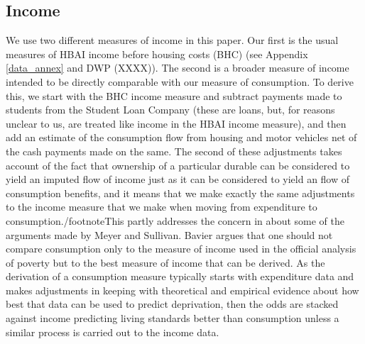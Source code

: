 \subsection{Income}
We use two different measures of income in this paper.  Our first is the usual measures of HBAI income before housing costs (BHC) (see Appendix \ref{data_annex} and DWP (XXXX)). The second is a broader measure of income intended to be directly comparable with our measure of consumption. To derive this, we start with the BHC income measure and subtract payments made to students from the Student Loan Company (these are loans, but, for reasons unclear to us, are treated like income in the HBAI income measure), and then add an estimate of the consumption flow from housing and motor vehicles net of the cash payments made on the same. The second of these adjustments takes account of the fact that ownership of a particular durable can be considered to yield an imputed flow of income just as it can be considered to yield an flow of consumption benefits, and it means that we make exactly the same adjustments to the income measure that we make when moving from expenditure to consumption./footnote{This partly addresses the concern in \cite{Bavier2008} about some of the arguments made by Meyer and Sullivan. Bavier argues that one should not compare consumption only to the measure of income used in the official analysis of poverty but to the best measure of income that can be derived. As the derivation of a consumption measure typically starts with expenditure data and makes adjustments in keeping with theoretical and empirical evidence about how best that data can be used to predict deprivation, then the odds are stacked against income predicting living standards better than consumption unless a similar process is carried out to the income data.} 

